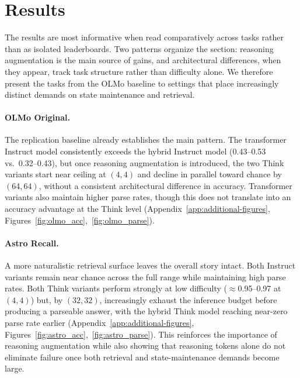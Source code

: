 \documentclass[11pt]{article}
\theoremstyle{definition}
\begin{document}

\section{Results}
\label{sec:results}

The results are most informative when read comparatively across tasks rather than as isolated leaderboards. Two patterns organize the section: reasoning augmentation is the main source of gains, and architectural differences, when they appear, track task structure rather than difficulty alone. We therefore present the tasks from the OLMo baseline to settings that place increasingly distinct demands on state maintenance and retrieval.

\paragraph{OLMo Original.} The replication baseline already establishes the main pattern. The transformer Instruct model consistently exceeds the hybrid Instruct model (0.43--0.53 vs.\ 0.32--0.43), but once reasoning augmentation is introduced, the two Think variants start near ceiling at $(4,4)$ and decline in parallel toward chance by $(64,64)$, without a consistent architectural difference in accuracy. Transformer variants also maintain higher parse rates, though this does not translate into an accuracy advantage at the Think level (Appendix~\ref{app:additional-figures}, Figures~\ref{fig:olmo_acc},~\ref{fig:olmo_parse}).

\paragraph{Astro Recall.} A more naturalistic retrieval surface leaves the overall story intact. Both Instruct variants remain near chance across the full range while maintaining high parse rates. Both Think variants perform strongly at low difficulty ($\approx$0.95--0.97 at $(4,4)$) but, by $(32,32)$, increasingly exhaust the inference budget before producing a parseable answer, with the hybrid Think model reaching near-zero parse rate earlier (Appendix~\ref{app:additional-figures}, Figures~\ref{fig:astro_acc},~\ref{fig:astro_parse}). This reinforces the importance of reasoning augmentation while also showing that reasoning tokens alone do not eliminate failure once both retrieval and state-maintenance demands become large.
\end{document}
